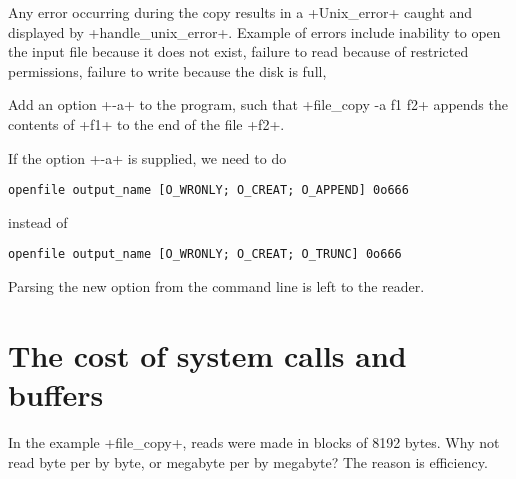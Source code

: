 Any error occurring during the copy results in a \ml+Unix_error+
caught and displayed by \ml+handle_unix_error+. Example of errors
include inability to open the input file because it does not
exist, failure to read because of restricted permissions, failure to
write because the disk is full, \etc

\begin{exercise} 
Add an option \ml+-a+ to the program, such that 
\ml+file_copy -a f1 f2+ appends the contents of \ml+f1+ to the end of
the file \ml+f2+. 
\end{exercise}
\begin{answer}
If the option \ml+-a+ is supplied, we need to do 
%
\begin{lstlisting}
openfile output_name [O_WRONLY; O_CREAT; O_APPEND] 0o666
\end{lstlisting}
%
instead of
%
\begin{lstlisting}
openfile output_name [O_WRONLY; O_CREAT; O_TRUNC] 0o666
\end{lstlisting}
%
Parsing the new option from the command line is left to the reader. 
\end{answer}

\section{The cost of system calls and buffers}

In the example \ml+file_copy+, reads were made in blocks of 8192
bytes. Why not read byte per by byte, or megabyte per by megabyte?
The reason is efficiency.

